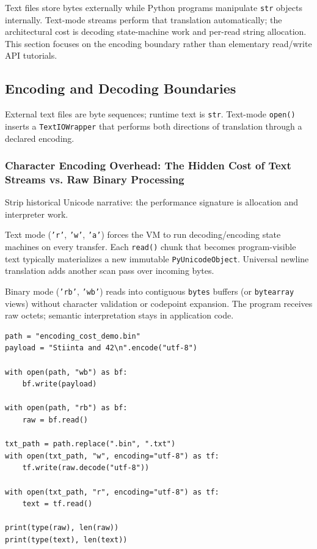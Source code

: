 \documentclass[a4paper,twoside]{report}
\begin{document}
Text files store bytes externally while Python programs manipulate \texttt{str} objects internally. Text-mode streams perform that translation automatically; the architectural cost is decoding state-machine work and per-read string allocation. This section focuses on the encoding boundary rather than elementary read/write API tutorials.


\subsection{Encoding and Decoding Boundaries}

External text files are byte sequences; runtime text is \texttt{str}. Text-mode \texttt{open()} inserts a \texttt{TextIOWrapper} that performs both directions of translation through a declared encoding.

\subsubsection{Character Encoding Overhead: The Hidden Cost of Text Streams vs. Raw Binary Processing}

Strip historical Unicode narrative: the performance signature is allocation and interpreter work.

Text mode (\texttt{'r'}, \texttt{'w'}, \texttt{'a'}) forces the VM to run decoding/encoding state machines on every transfer. Each \texttt{read()} chunk that becomes program-visible text typically materializes a new immutable \texttt{PyUnicodeObject}. Universal newline translation adds another scan pass over incoming bytes.

Binary mode (\texttt{'rb'}, \texttt{'wb'}) reads into contiguous \texttt{bytes} buffers (or \texttt{bytearray} views) without character validation or codepoint expansion. The program receives raw octets; semantic interpretation stays in application code.

\begin{verbatim}
path = "encoding_cost_demo.bin"
payload = "Stiinta and 42\n".encode("utf-8")

with open(path, "wb") as bf:
    bf.write(payload)

with open(path, "rb") as bf:
    raw = bf.read()

txt_path = path.replace(".bin", ".txt")
with open(txt_path, "w", encoding="utf-8") as tf:
    tf.write(raw.decode("utf-8"))

with open(txt_path, "r", encoding="utf-8") as tf:
    text = tf.read()

print(type(raw), len(raw))
print(type(text), len(text))
\end{verbatim}
\end{document}
